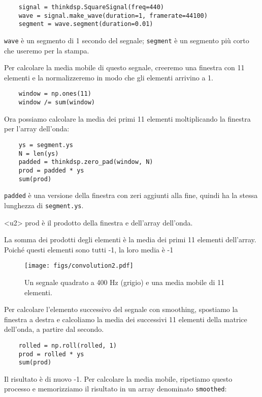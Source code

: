 \documentclass[12pt]{book} \usepackage[width=5.5in,height=8.5in, hmarginratio=3:2,vmarginratio=1:1]{geometry}
\begin{document}
\begin{verbatim} 
    signal = thinkdsp.SquareSignal(freq=440)
    wave = signal.make_wave(duration=1, framerate=44100)
    segment = wave.segment(duration=0.01)
 \end{verbatim} 

{\tt wave} è un segmento di 1 secondo del segnale; {\tt segment} è un segmento più corto che useremo per la stampa.

Per calcolare la media mobile di questo segnale, creeremo una finestra con 11 elementi e la normalizzeremo in modo che gli elementi arrivino a 1.

\begin{verbatim} 
    window = np.ones(11)
    window /= sum(window)
 \end{verbatim} 

Ora possiamo calcolare la media dei primi 11 elementi moltiplicando la finestra per l'array dell'onda:

\begin{verbatim} 
    ys = segment.ys
    N = len(ys)
    padded = thinkdsp.zero_pad(window, N)
    prod = padded * ys
    sum(prod)
 \end{verbatim} 

{\tt padded} è una versione della finestra con zeri aggiunti alla fine, quindi ha la stessa lunghezza di {\tt segment.ys}.

{<u2> prod} è il prodotto della finestra e dell'array dell'onda.

La somma dei prodotti degli elementi è la media dei primi 11 elementi dell'array. Poiché questi elementi sono tutti -1, la loro media è -1

\begin{figure} 

\centerline{\texttt{[image: figs/convolution2.pdf]}} \caption{Un segnale quadrato a 400 Hz (grigio) e una media mobile di 11 elementi.} \label{fig.convolution2} \end{figure} 

Per calcolare l'elemento successivo del segnale con smoothing, spostiamo la finestra a destra e calcoliamo la media dei successivi 11 elementi della matrice dell'onda, a partire dal secondo.

\begin{verbatim} 
    rolled = np.roll(rolled, 1)
    prod = rolled * ys
    sum(prod)
 \end{verbatim} 

Il risultato è di nuovo -1. Per calcolare la media mobile, ripetiamo questo processo e memorizziamo il risultato in un array denominato {\tt smoothed}:
\end{document}

